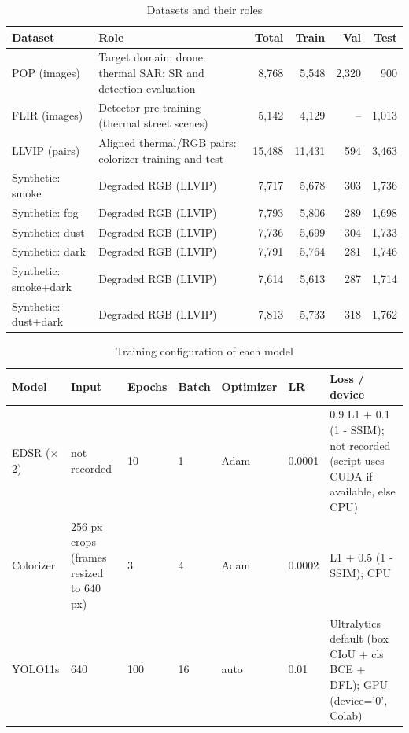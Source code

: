 
\begin{table}[t]
\centering
\caption{Datasets and their roles}
\label{tab:datasets}
\small
\begin{tabular}{llrrrr}
\toprule
Dataset & Role & Total & Train & Val & Test \\
\midrule
POP (images) & Target domain: drone thermal SAR; SR and detection evaluation & 8{,}768 & 5{,}548 & 2{,}320 & 900 \\
FLIR (images) & Detector pre-training (thermal street scenes) & 5{,}142 & 4{,}129 & -- & 1{,}013 \\
LLVIP (pairs) & Aligned thermal/RGB pairs: colorizer training and test & 15{,}488 & 11{,}431 & 594 & 3{,}463 \\
\midrule
Synthetic: smoke & Degraded RGB (LLVIP) & 7{,}717 & 5{,}678 & 303 & 1{,}736 \\
Synthetic: fog & Degraded RGB (LLVIP) & 7{,}793 & 5{,}806 & 289 & 1{,}698 \\
Synthetic: dust & Degraded RGB (LLVIP) & 7{,}736 & 5{,}699 & 304 & 1{,}733 \\
Synthetic: dark & Degraded RGB (LLVIP) & 7{,}791 & 5{,}764 & 281 & 1{,}746 \\
Synthetic: smoke+dark & Degraded RGB (LLVIP) & 7{,}614 & 5{,}613 & 287 & 1{,}714 \\
Synthetic: dust+dark & Degraded RGB (LLVIP) & 7{,}813 & 5{,}733 & 318 & 1{,}762 \\
\bottomrule
\end{tabular}
\end{table}

\begin{table}[t]
\centering
\caption{Training configuration of each model}
\label{tab:train}
\small
\begin{tabular}{lllllll}
\toprule
Model & Input & Epochs & Batch & Optimizer & LR & Loss / device \\
\midrule
EDSR ($\times$2) & not recorded & 10 & 1 & Adam & 0.0001 & 0.9 L1 + 0.1 (1 - SSIM); not recorded (script uses CUDA if available, else CPU) \\
Colorizer & 256 px crops (frames resized to 640 px) & 3 & 4 & Adam & 0.0002 & L1 + 0.5 (1 - SSIM); CPU \\
YOLO11s & 640 & 100 & 16 & auto & 0.01 & Ultralytics default (box CIoU + cls BCE + DFL); GPU (device='0', Colab) \\
\bottomrule
\end{tabular}
\end{table}

